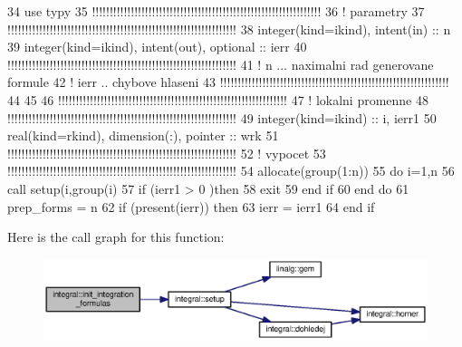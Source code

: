 \begin{DoxyCode}
34       \textcolor{keywordtype}{use }typy
35       \textcolor{comment}{!!!!!!!!!!!!!!!!!!!!!!!!!!!!!!!!!!!!!!!!!!!!!!!!!!!!!!!!!!!!!!!!!
}
36       \textcolor{comment}{!   parametry
}
37       \textcolor{comment}{!!!!!!!!!!!!!!!!!!!!!!!!!!!!!!!!!!!!!!!!!!!!!!!!!!!!!!!!!!!!!!!!! 
}
38       \textcolor{keywordtype}{integer(kind=ikind)}, \textcolor{keywordtype}{intent(in)}  :: n
39       \textcolor{keywordtype}{integer(kind=ikind)}, \textcolor{keywordtype}{intent(out)}, \textcolor{keywordtype}{optional} :: ierr 
40       \textcolor{comment}{!!!!!!!!!!!!!!!!!!!!!!!!!!!!!!!!!!!!!!!!!!!!!!!!!!!!!!!!!!!!!!!!!
}
41       \textcolor{comment}{! n ... naximalni rad generovane formule
}
42       \textcolor{comment}{! ierr .. chybove hlaseni
}
43       \textcolor{comment}{!!!!!!!!!!!!!!!!!!!!!!!!!!!!!!!!!!!!!!!!!!!!!!!!!!!!!!!!!!!!!!!!!    
}
44       
45       
46       \textcolor{comment}{!!!!!!!!!!!!!!!!!!!!!!!!!!!!!!!!!!!!!!!!!!!!!!!!!!!!!!!!!!!!!!!!!
}
47       \textcolor{comment}{! lokalni promenne
}
48       \textcolor{comment}{!!!!!!!!!!!!!!!!!!!!!!!!!!!!!!!!!!!!!!!!!!!!!!!!!!!!!!!!!!!!!!!!!
}
49       \textcolor{keywordtype}{integer(kind=ikind)}  :: i, ierr1
50       \textcolor{keywordtype}{real(kind=rkind)}, \textcolor{keywordtype}{dimension(:)}, \textcolor{keywordtype}{pointer} :: wrk
51       \textcolor{comment}{!!!!!!!!!!!!!!!!!!!!!!!!!!!!!!!!!!!!!!!!!!!!!!!!!!!!!!!!!!!!!!!!!
}
52       \textcolor{comment}{! vypocet
}
53       \textcolor{comment}{!!!!!!!!!!!!!!!!!!!!!!!!!!!!!!!!!!!!!!!!!!!!!!!!!!!!!!!!!!!!!!!!!
}
54       \textcolor{keyword}{allocate}(group(1:n))
55       \textcolor{keywordflow}{do} i=1,n
56         \textcolor{keyword}{call }setup(i,group(i)%
57         \textcolor{keywordflow}{if} (ierr1 > 0 )then
58           exit
59 \textcolor{keyword}{        end }if
60 \textcolor{keyword}{      end }do
61       prep_forms = n
62       \textcolor{keywordflow}{if} (\textcolor{keyword}{present}(ierr)) then
63         ierr = ierr1
64 \textcolor{keyword}{      end }if
\end{DoxyCode}


Here is the call graph for this function\+:\nopagebreak
\begin{figure}[H]
\begin{center}
\leavevmode
\includegraphics[width=350pt]{namespaceintegral_a68d4493444bb3e0032f10353bdfebbaf_cgraph}
\end{center}
\end{figure}


